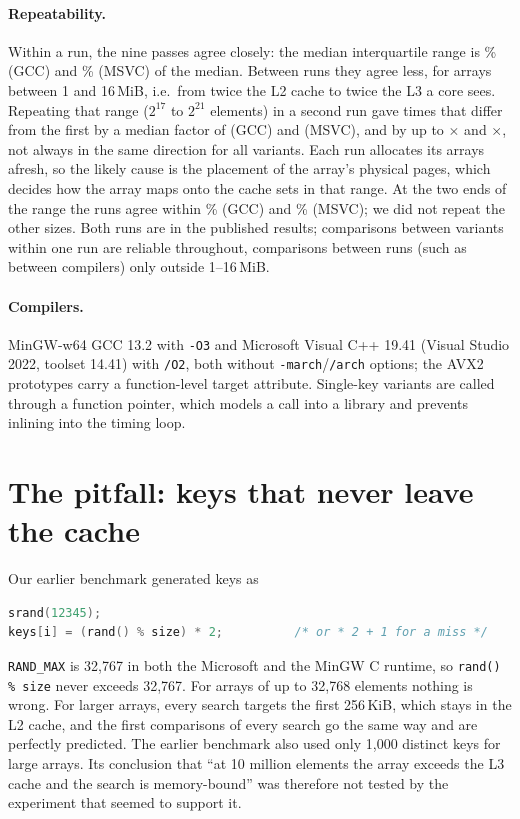 \documentclass[11pt]{article}
\begin{document}
\paragraph{Repeatability.} Within a run, the nine passes agree closely: the
median interquartile range is \% (GCC) and
\% (MSVC) of the median. Between runs they agree less, for
arrays between 1 and 16\,MiB, i.e.\ from twice the L2 cache to twice the L3 a
core sees. Repeating that range ($2^{17}$ to $2^{21}$ elements) in a second run gave
times that differ from the first by a median factor of
 (GCC) and  (MSVC), and by
up to $\times$ and $\times$, not
always in the same direction for all variants. Each run allocates its arrays afresh, so the
likely cause is the placement of the array's physical pages, which decides how
the array maps onto the cache sets in that range. At the two ends of the range
the runs agree within \% (GCC) and \% (MSVC);
we did not repeat the other sizes. Both runs
are in the published results; comparisons between variants
within one run are reliable throughout, comparisons between runs (such as
between compilers) only outside 1--16\,MiB.

\paragraph{Compilers.} MinGW-w64 GCC 13.2 with \texttt{-O3} and Microsoft
Visual C++ 19.41 (Visual Studio 2022, toolset 14.41) with \texttt{/O2}, both without
\texttt{-march}/\texttt{/arch} options; the AVX2 prototypes carry a function-level
target attribute. Single-key variants are called through a function pointer,
which models a call into a library and prevents inlining into the timing loop.

\section{The pitfall: keys that never leave the cache}\label{sec:pitfall}

Our earlier benchmark generated keys as
\begin{lstlisting}[language=C]
srand(12345);
keys[i] = (rand() % size) * 2;          /* or * 2 + 1 for a miss */
\end{lstlisting}
\texttt{RAND\_MAX} is 32{,}767 in both the Microsoft and the MinGW C runtime, so
\texttt{rand() \% size} never exceeds 32{,}767. For arrays of up to 32{,}768
elements nothing is wrong. For larger arrays, every search targets the first
256\,KiB, which stays in the L2 cache, and the first comparisons of every search
go the same way and are perfectly predicted. The earlier benchmark also used
only 1{,}000 distinct keys for large arrays. Its conclusion that ``at 10 million
elements the array exceeds the L3 cache and the search is memory-bound'' was
therefore not tested by the experiment that seemed to support it.
\end{document}
